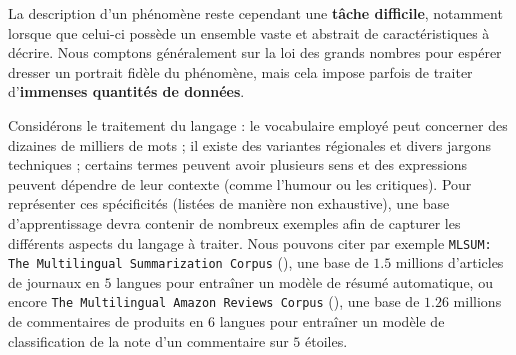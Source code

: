 			La description d'un phénomène reste cependant une \textbf{tâche difficile}, notamment lorsque que celui-ci possède un ensemble vaste et abstrait de caractéristiques à décrire.
			Nous comptons généralement sur la loi des grands nombres pour espérer dresser un portrait fidèle du phénomène, mais cela impose parfois de traiter d'\textbf{immenses quantités de données}.
			\begin{leftBarExamples}
				Considérons le traitement du langage : le vocabulaire employé peut concerner des dizaines de milliers de mots ; il existe des variantes régionales et divers jargons techniques ; certains termes peuvent avoir plusieurs sens et des expressions peuvent dépendre de leur contexte (comme l'humour ou les critiques).
				Pour représenter ces spécificités (listées de manière non exhaustive), une base d'apprentissage devra contenir de nombreux exemples afin de capturer les différents aspects du langage à traiter.
				Nous pouvons citer par exemple \texttt{MLSUM: The Multilingual Summarization Corpus} (\cite{scialom-etal:2020:mlsum-multilingual-summarization}), une base de $1.5$ millions d'articles de journaux en $5$ langues pour entraîner un modèle de résumé automatique, ou encore \texttt{The Multilingual Amazon Reviews Corpus} (\cite{keung-etal:2020:multilingual-amazon-reviewsa}), une base de $1.26$ millions de commentaires de produits en $6$ langues pour entraîner un modèle de classification de la note d'un commentaire sur $5$ étoiles.
			\end{leftBarExamples}
			
